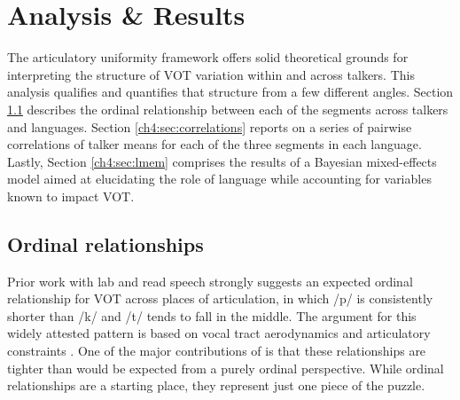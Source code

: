 \section{Analysis \& Results}

The articulatory uniformity framework offers solid theoretical grounds for interpreting the structure of VOT variation within and across talkers. This analysis qualifies and quantifies that structure from a few different angles. Section \ref{ch4:sec:ordrel} describes the ordinal relationship between each of the segments across talkers and languages. Section \ref{ch4:sec:correlations} reports on a series of pairwise correlations of talker means for each of the three segments in each language. Lastly, Section \ref{ch4:sec:lmem} comprises the results of a Bayesian mixed-effects model aimed at elucidating the role of language while accounting for variables known to impact VOT.

\subsection{Ordinal relationships}\label{ch4:sec:ordrel}

Prior work with lab and read speech strongly suggests an expected ordinal relationship for VOT across places of articulation, in which /p/ is consistently shorter than /k/ and /t/ tends to fall in the middle. The argument for this widely attested pattern is based on vocal tract aerodynamics and articulatory constraints \citep{cho_1999_vot}. One of the major contributions of \citet{chodroff_2017_structure} is that these relationships are tighter than would be expected from a purely ordinal perspective. While ordinal relationships are a starting place, they represent just one piece of the puzzle. 

